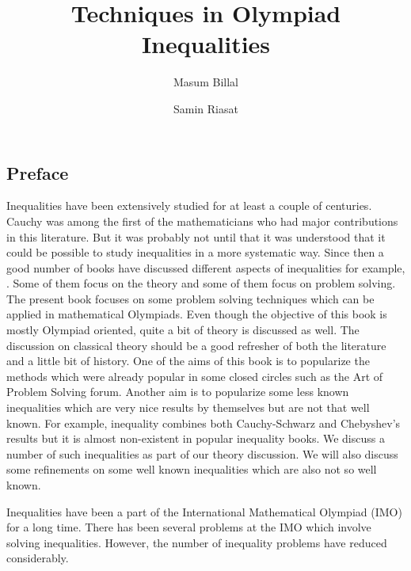 \documentclass[a4paper, 12pt, leqno,]{book}
\title{\bfseries Techniques in Olympiad Inequalities}
\author{Masum Billal\and Samin Riasat}
\theoremstyle{definition}
\numberwithin{problem}{chapter}
\begin{document}
	\frontmatter
	\maketitle
	\begin{refsection}
		\section*{Preface}
		Inequalities have been extensively studied for at least a couple of centuries. Cauchy was among the first of the mathematicians who had major contributions in this literature. But it was probably not until \textcite{hardy_littlewood_poolya_2018} that it was understood that it could be possible to study inequalities in a more systematic way. Since then a good number of books have discussed different aspects of inequalities for example, \textcite{beckenbach_bellman_1983}. Some of them focus on the theory and some of them focus on problem solving. The present book focuses on some problem solving techniques which can be applied in mathematical Olympiads. Even though the objective of this book is mostly Olympiad oriented, quite a bit of theory is discussed as well. The discussion on classical theory should be a good refresher of both the literature and a little bit of history. One of the aims of this book is to popularize the methods which were already popular in some closed circles such as the Art of Problem Solving forum. Another aim is to popularize some less known inequalities which are very nice results by themselves but are not that well known. For example, \textcite{Seitz1936} inequality combines both Cauchy-Schwarz and Chebyshev's results but it is almost non-existent in popular inequality books. We discuss a number of such inequalities as part of our theory discussion. We will also discuss some refinements on some well known inequalities which are also not so well known.
		
		Inequalities have been a part of the International Mathematical Olympiad (IMO) for a long time. There has been several problems at the IMO which involve solving inequalities. However, the number of inequality problems have reduced considerably. 
		\printbibliography
	\end{refsection}
	\tableofcontents
	\mainmatter
	
	\begin{refsection}
		
		
		
		
		
		
		\printbibliography
	\end{refsection}
	
\end{document}
